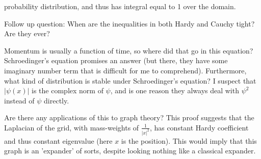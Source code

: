 probability distribution, and thus has integral equal to 1 over
the domain.
\begin{remark} Follow up question: When are the inequalities in
both Hardy and Cauchy tight? Are they ever?
\end{remark}
\begin{remark} Momentum is usually a function of time, so where
did that go in this equation? Schroedinger's equation promises an
answer (but there, they have some imaginary number term that is
difficult for me to comprehend). Furthermore, what kind of
distribution is stable under Schroedinger's equation?
I suspect that $|\psi(x)|$ is the complex norm of $\psi$, and is
one reason they always deal with $\psi^2$ instead of $\psi$
directly.
\end{remark}
\begin{remark}
Are there any applications of this to graph theory? This proof
suggests that the Laplacian of the grid, with mass-weights of
$\frac{1}{|x|^2}$, has constant Hardy coefficient and thus
constant eigenvalue (here $x$ is the position). This would imply
that this graph is an 'expander' of sorts, despite looking
nothing like a classical expander.
\end{remark}


